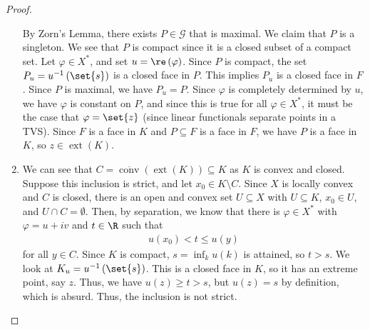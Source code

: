 \documentclass[10pt]{mypackage}
\begin{document}
\begin{proof}
\begin{enumerate}[(1)]
      By Zorn's Lemma, there exists $P\in \mathcal{G}$ that is maximal. We claim that $P$ is a singleton. We see that $P$ is compact since it is a closed subset of a compact set. Let $\varphi\in X^{\ast}$, and set $u = \re\left(\varphi\right)$. Since $P$ is compact, the set $P_u = u^{-1}\left(\set{s}\right)$ is a closed face in $P$. This implies $P_u$ is a closed face in $F$. Since $P$ is maximal, we have $P_u = P$. Since $\varphi$ is completely determined by $u$, we have $\varphi$ is constant on $P$, and since this is true for all $\varphi\in X^{\ast}$, it must be the case that $\varphi = \set{z}$ (since linear functionals separate points in a TVS). Since $F$ is a face in $K$ and $P\subseteq F$ is a face in $F$, we have $P$ is a face in $K$, so $z\in \operatorname{ext}\left(K\right)$.
    \item We can see that $C = \overline{\operatorname{conv}}\left(\operatorname{ext}\left(K\right)\right)\subseteq K$ as $K$ is convex and closed. Suppose this inclusion is strict, and let $x_0\in K\setminus C$. Since $X$ is locally convex and $C$ is closed, there is an open and convex set $U\subseteq X$ with $U\subseteq K$, $x_0\in U$, and $U\cap C = \emptyset$. Then, by separation, we know that there is $\varphi\in X^{\ast}$ with $\varphi = u + iv$ and $t\in \R$ such that
      \begin{align*}
        u\left(x_0\right) < t \leq u(y)
      \end{align*}
      for all $y\in C$. Since $K$ is compact, $s = \inf_{k}u(k)$ is attained, so $t > s$. We look at $K_u = u^{-1}\left(\set{s}\right)$. This is a closed face in $K$, so it has an extreme point, say $z$. Thus, we have $u(z) \geq t > s$, but $u(z) = s$ by definition, which is absurd. Thus, the inclusion is not strict.
  \end{enumerate}
\end{proof}
\end{document}
